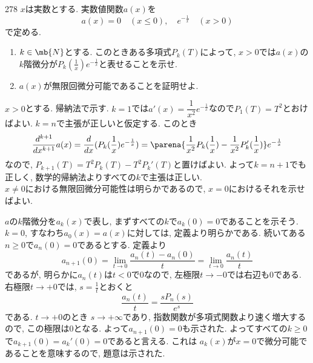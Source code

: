 \begin{thm}{278}{}{}
    $x$は実数とする. 実数値関数$a(x)$を
    \[
    a(x) = 0 \quad (x\leq 0),\quad e^{-\frac{1}{x}} \quad (x>0)
    \]
    で定める. 
    \begin{enumerate}
        \item $k\in \mb{N}$とする. このときある多項式$P_k(T)$によって, $x>0$では$a(x)$の$k$階微分が$P_k(\frac{1}{x}) e^{-\frac{1}{x}}$と表せることを示せ. 
        \item $a(x)$が無限回微分可能であることを証明せよ.
    \end{enumerate}
\end{thm}
 $x>0$とする. 
帰納法で示す. $k=1$では$a'(x) = \dfrac{1}{x^2} e^{-\frac{1}{x}}$なので$P_1(T) = T^2$とおけばよい. $k=n$で主張が正しいと仮定する. このとき
\[
\dfrac{d^{k+1}}{dx^{k+1}} a(x) = \dfrac{d}{dx} (P_k(\frac{1}{x})e^{-\frac{1}{x}}) = \parena{ \dfrac{1}{x^2} P_k(\frac{1}{x}) - \dfrac{1}{x^2} P_k'(\frac{1}{x})  }e^{-\frac{1}{x}}     
\]
なので, $P_{k+1}(T) = T^2 P_k(T) - T^2 P_k'(T)$と置けばよい. よって$k=n+1$でも正しく, 数学的帰納法よりすべての$k$で主張は正しい. \\
$x\neq 0$における無限回微分可能性は明らかであるので, $x=0$におけるそれを示せばよい.\par 
$a$の$k$階微分を$a_k(x)$で表し, まずすべての$k$で$a_k(0) = 0$であることを示そう. $k=0$, すなわち$a_0(x) = a(x)$に対しては, 定義より明らかである. 
続いてある$n\geq 0$で$a_n(0) = 0$であるとする. 定義より
\[a_{n+1}(0) = \lim_{t\to 0} \dfrac{a_{n}(t) - a_{n}(0)}{t} = \lim_{t\to 0} \dfrac{a_n(t)}{t}\]
であるが, 明らかに$a_n(t)$は$t<0$で0なので, 左極限$t\to -0$では右辺も$0$である. 右極限$t\to +0$では, $s=\frac{1}{t}$とおくと
\[
   \dfrac{a_n(t)}{t} = \dfrac{sP_n(s)}{e^{s}}
\]
である. $t\to +0$のとき $s\to +\infty$であり, 指数関数が多項式関数より速く増大するので, この極限は0となる. よって$a_{n+1}(0) = 0$も示された. 
よってすべての$k\geq 0$で$a_{k+1}(0) = a_k'(0) = 0$であると言える. これは $a_{k}(x)$が$x=0$で微分可能であることを意味するので, 題意は示された. 